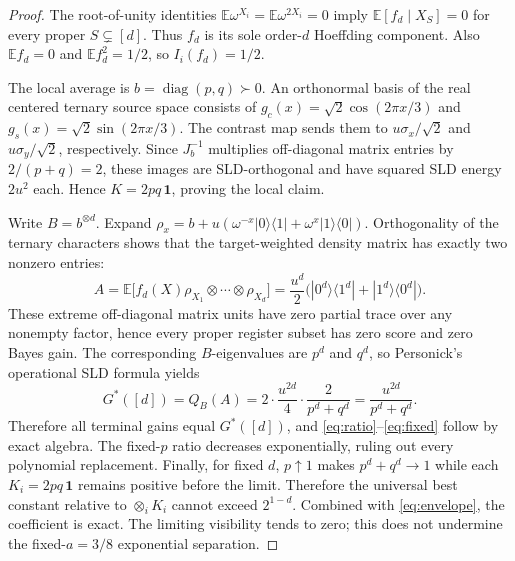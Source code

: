 \documentclass[11pt]{article}
\newcommand{\E}{\mathbb E}
\newcommand{\id}{\mathbf 1}
\begin{document}
\begin{proof}
The root-of-unity identities $\E\omega^{X_i}=\E\omega^{2X_i}=0$ imply $\E[f_d\mid X_S]=0$ for every proper $S\subsetneq[d]$. Thus $f_d$ is its sole order-$d$ Hoeffding component. Also $\E f_d=0$ and $\E f_d^2=1/2$, so $I_i(f_d)=1/2$.

The local average is $b=\operatorname{diag}(p,q)\succ0$. An orthonormal basis of the real centered ternary source space consists of $g_c(x)=\sqrt2\cos(2\pi x/3)$ and $g_s(x)=\sqrt2\sin(2\pi x/3)$. The contrast map sends them to $u\sigma_x/\sqrt2$ and $u\sigma_y/\sqrt2$, respectively. Since $J_b^{-1}$ multiplies off-diagonal matrix entries by $2/(p+q)=2$, these images are SLD-orthogonal and have squared SLD energy $2u^2$ each. Hence $K=2pq\,\id$, proving the local claim.

Write $B=b^{\otimes d}$. Expand $\rho_x=b+u(\omega^{-x}|0\rangle\langle1|+\omega^x|1\rangle\langle0|)$. Orthogonality of the ternary characters shows that the target-weighted density matrix has exactly two nonzero entries:
\[
 A=\E\bigl[f_d(X)\rho_{X_1}\otimes\cdots\otimes\rho_{X_d}\bigr]
 =\frac{u^d}{2}\bigl(|0^d\rangle\langle1^d|+|1^d\rangle\langle0^d|\bigr).
\]
These extreme off-diagonal matrix units have zero partial trace over any nonempty factor, hence every proper register subset has zero score and zero Bayes gain. The corresponding $B$-eigenvalues are $p^d$ and $q^d$, so Personick's operational SLD formula yields
\[
 G^*([d])=Q_B(A)=2\cdot\frac{u^{2d}}4\cdot\frac{2}{p^d+q^d}=\frac{u^{2d}}{p^d+q^d}.
\]
Therefore all terminal gains equal $G^*([d])$, and \eqref{eq:ratio}--\eqref{eq:fixed} follow by exact algebra. The fixed-$p$ ratio decreases exponentially, ruling out every polynomial replacement. Finally, for fixed $d$, $p\uparrow1$ makes $p^d+q^d\to1$ while each $K_i=2pq\,\id$ remains positive before the limit. Therefore the universal best constant relative to $\otimes_iK_i$ cannot exceed $2^{1-d}$. Combined with \eqref{eq:envelope}, the coefficient is exact. The limiting visibility tends to zero; this does not undermine the fixed-$a=3/8$ exponential separation.
\end{proof}
\end{document}
